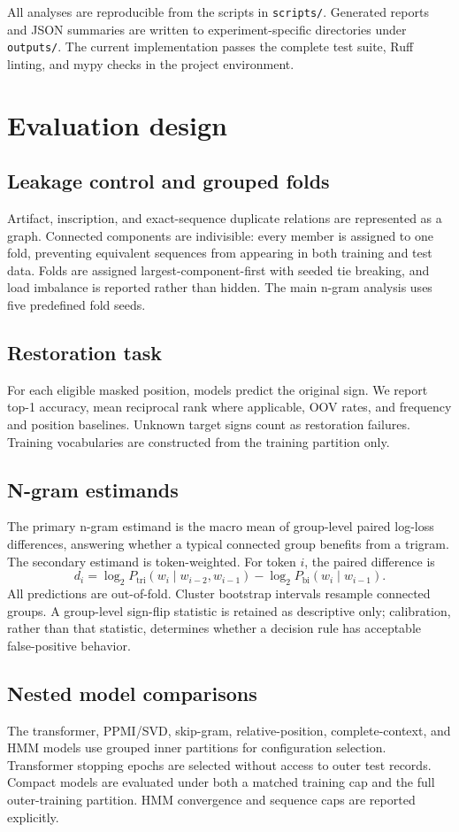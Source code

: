 \documentclass[11pt]{article}
\begin{document}
All analyses are reproducible from the scripts in \texttt{scripts/}. Generated reports and JSON summaries are written to experiment-specific directories under \texttt{outputs/}. The current implementation passes the complete test suite, Ruff linting, and mypy checks in the project environment.

\section{Evaluation design}
\subsection{Leakage control and grouped folds}
Artifact, inscription, and exact-sequence duplicate relations are represented as a graph. Connected components are indivisible: every member is assigned to one fold, preventing equivalent sequences from appearing in both training and test data. Folds are assigned largest-component-first with seeded tie breaking, and load imbalance is reported rather than hidden. The main n-gram analysis uses five predefined fold seeds.

\subsection{Restoration task}
For each eligible masked position, models predict the original sign. We report top-1 accuracy, mean reciprocal rank where applicable, OOV rates, and frequency and position baselines. Unknown target signs count as restoration failures. Training vocabularies are constructed from the training partition only.

\subsection{N-gram estimands}
The primary n-gram estimand is the macro mean of group-level paired log-loss differences, answering whether a typical connected group benefits from a trigram. The secondary estimand is token-weighted. For token $i$, the paired difference is
\[
d_i = \log_2 P_{\mathrm{tri}}(w_i\mid w_{i-2},w_{i-1})-\log_2 P_{\mathrm{bi}}(w_i\mid w_{i-1}).
\]
All predictions are out-of-fold. Cluster bootstrap intervals resample connected groups. A group-level sign-flip statistic is retained as descriptive only; calibration, rather than that statistic, determines whether a decision rule has acceptable false-positive behavior.

\subsection{Nested model comparisons}
The transformer, PPMI/SVD, skip-gram, relative-position, complete-context, and HMM models use grouped inner partitions for configuration selection. Transformer stopping epochs are selected without access to outer test records. Compact models are evaluated under both a matched training cap and the full outer-training partition. HMM convergence and sequence caps are reported explicitly.
\end{document}
